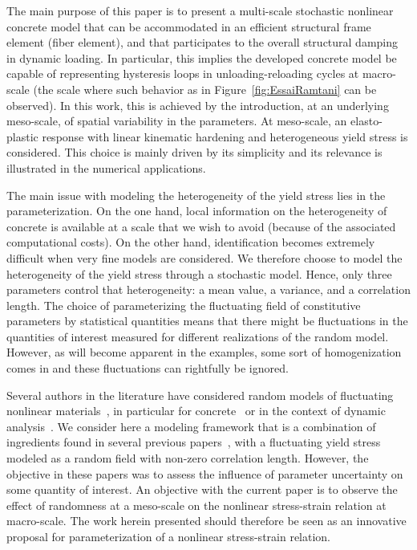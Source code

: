 \documentclass[12p]{amsart}
\begin{document}
The main purpose of this paper is to present a multi-scale stochastic nonlinear concrete model that can be accommodated in an efficient structural frame element (fiber element), and that participates to the overall structural damping in dynamic loading. In particular, this implies the developed concrete model be capable of representing hysteresis loops in unloading-reloading cycles at macro-scale (the scale where such behavior as in Figure~\ref{fig:EssaiRamtani} can be observed). In this work, this is achieved by the introduction, at an underlying meso-scale, of spatial variability in the parameters. At meso-scale, an elasto-plastic response with linear kinematic hardening and heterogeneous yield stress is considered. This choice is mainly driven by its simplicity and its relevance is illustrated in the numerical applications.

The main issue with modeling the heterogeneity of the yield stress lies in the parameterization. On the one hand, local information on the heterogeneity of concrete is available at a scale that we wish to avoid (because of the associated computational costs). On the other hand, identification becomes extremely difficult when very fine models are considered. We therefore choose to model the heterogeneity of the yield stress through a stochastic model. Hence, only three parameters control that heterogeneity: a mean value, a variance, and a correlation length. The choice of parameterizing the fluctuating field of constitutive parameters by statistical quantities means that there might be fluctuations in the quantities of interest measured for different realizations of the random model. However, as will become apparent in the examples, some sort of homogenization comes in and these fluctuations can rightfully be ignored.

Several authors in the literature have considered random models of fluctuating nonlinear materials~\cite{Frantziskonis1998, Huet1997, Anders2001, RosMat2008}, in particular for concrete~\cite{Huh2001, ReaFilMae2003, LeeMos2004, Wriggers2006, Stroeven2008, Yang2009, Namikawa2013} or in the context of dynamic analysis~\cite{Schueller1999, Li2004, SteFra2009}. We consider here a modeling framework that is a combination of ingredients found in several previous papers~\cite{Liu1986, Brenner1995, Huh2001, Namikawa2013}, with a fluctuating yield stress modeled as a random field with non-zero correlation length. However, the objective in these papers was to assess the influence of parameter uncertainty on some quantity of interest. An objective with the current paper is to observe the effect of randomness at a meso-scale on the nonlinear stress-strain relation at macro-scale. The work herein presented should therefore be seen as an innovative proposal for parameterization of a nonlinear stress-strain relation.
\end{document}
